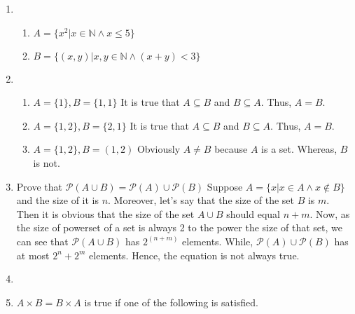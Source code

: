 \documentclass[12pt]{article}
\title{CSE232 Assignment #1}
\author{Nurseiit Abdimomyn -- 20172001}
\date{09/10/2018}
\begin{document}
\maketitle

\begin{enumerate}
  \item 
      \begin{enumerate}
        \item ${A = \{ x^2 | x \in \mathbb{N} \land x \le 5 \}}$ 
        \item ${B = \{ (x, y) | x, y \in \mathbb{N} \land (x + y) < 3 \}}$
      \end{enumerate}
  \item 
      \begin{enumerate}
        \item ${A = \{ 1 \}, B = \{ 1, 1 \}}$
              \linebreak It is true that ${A \subseteq B}$ and ${B \subseteq A}$. Thus, $A = B$.
        \item ${A = \{ 1, 2 \}, B = \{ 2, 1 \}}$
              \linebreak It is true that ${A \subseteq B}$ and ${B \subseteq A}$. Thus, $A = B$.
        \item ${A = \{ 1, 2 \}, B = (1, 2)}$
              \linebreak Obviously ${A \neq B}$ because ${A}$ is a set. Whereas, $B$ is not.
      \end{enumerate}
  \item 
      Prove that ${\mathcal P \left({ A \cup B }\right) = \mathcal P \left({A}\right) \cup \mathcal P \left({B}\right)}$
      \newline \newline
      Suppose ${A = \{ x | x \in A \land x \notin B  \}}$ and the size of it is $n$. Moreover, let's say that the size of the set $B$ is $m$. Then it is obvious that the size of the set ${A \cup B}$ should equal $n+m$.
      \newline
      Now, as the size of powerset of a set is always 2 to the power the size of that set, we can see that ${\mathcal P \left({ A \cup B }\right)}$ has $2^{(n+m)}$ elements. While, ${\mathcal P \left({A}\right) \cup \mathcal P \left({B}\right)}$ has at most $2^{n} + 2^{m}$ elements. Hence, the equation is not always true.
  \item
  \item ${A \times B = B \times A}$ is true if one of the following is satisfied.
    \begin{enumerate}

\end{enumerate}
\end{enumerate}
\end{document}

